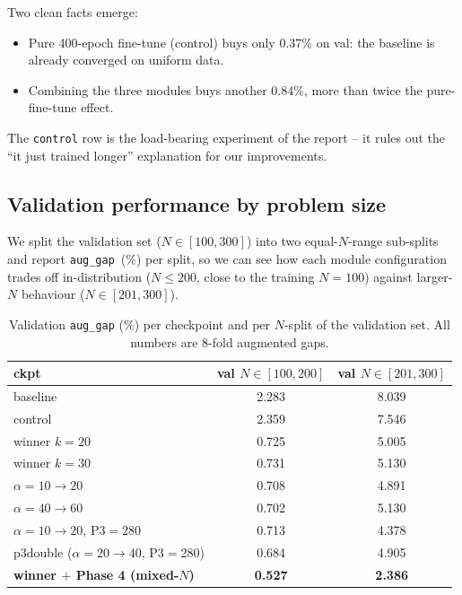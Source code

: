 \documentclass[11pt,a4paper]{article}
\begin{document}
Two clean facts emerge:
%
\begin{itemize}
  \item Pure 400-epoch fine-tune (control) buys only $0.37\%$ on val: the
        baseline is already converged on uniform data.
  \item Combining the three modules buys another $0.84\%$, more than twice
        the pure-fine-tune effect.
\end{itemize}
%
The \texttt{control} row is the load-bearing experiment of the report -- it
rules out the ``it just trained longer'' explanation for our improvements.

\subsection{Validation performance by problem size}
\label{sec:bucket}

We split the validation set ($N\!\in\![100,300]$) into two
equal-$N$-range sub-splits and report \texttt{aug\_gap}~($\%$) per split,
so we can see how each module configuration trades off in-distribution
($N\!\le\!200$, close to the training $N\!=\!100$) against larger-$N$
behaviour ($N\!\in\![201,300]$).

\begin{table}[t]
\centering
\caption{Validation \texttt{aug\_gap} ($\%$) per checkpoint and per
$N$-split of the validation set. All numbers are 8-fold augmented gaps.}
\label{tab:bucket}
\small
\begin{tabular}{l c c}
\toprule
ckpt                    & val $N\!\in\![100,200]$ & val $N\!\in\![201,300]$ \\
\midrule
baseline                                 & 2.283 & 8.039 \\
control                                  & 2.359 & 7.546 \\
\midrule
winner $k\!=\!20$                        & 0.725 & 5.005 \\
winner $k\!=\!30$                        & 0.731 & 5.130 \\
$\alpha\!=\!10\!\to\!20$                 & 0.708 & 4.891 \\
$\alpha\!=\!40\!\to\!60$                 & 0.702 & 5.130 \\
$\alpha\!=\!10\!\to\!20$, P3$=$280       & 0.713 & 4.378 \\
p3double ($\alpha\!=\!20\!\to\!40$, P3$=$280) & 0.684 & 4.905 \\
\midrule
\rowcolor{sdmblue!10}
\textbf{winner $+$ Phase 4 (mixed-$N$)}  & \textbf{0.527} & \textbf{2.386} \\
\bottomrule
\end{tabular}
\end{table}
\end{document}
